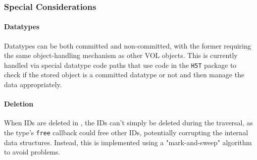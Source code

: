 \subsubsection{Special Considerations}

\paragraph{Datatypes}

Datatypes can be both committed and non-committed, with the former requiring the same object-handling mechanism as other VOL objects. This is currently handled via special datatype code paths that use code in the \texttt{H5T} package to check if the stored object is a committed datatype or not and then manage the data appropriately.

\paragraph{Deletion}

When IDs are deleted in , the IDs can't simply be deleted during the traversal, as the type's \texttt{free} callback could free other IDs, potentially corrupting the internal data structures. Instead, this is implemented using a "mark-and-sweep" algorithm to avoid problems.

